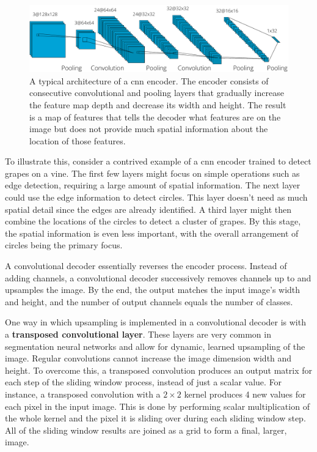 \begin{figure}[h]
 \centering
 \includegraphics[width=\linewidth]{images/cnn_encoder_example.pdf}
 \caption{A typical architecture of a \ac{cnn} encoder. The encoder consists of consecutive convolutional and pooling layers that gradually increase the feature map depth and decrease its width and height. The result is a map of features that tells the decoder what features are on the image but does not provide much spatial information about the location of those features. \cite{lecunGradientbasedLearningApplied1998}}
 \label{fig:cnn-encoder-achitecture}
 \end{figure}

To illustrate this, consider a contrived example of a \ac{cnn} encoder trained to detect grapes on a vine. The first few layers might focus on simple operations such as edge detection, requiring a large amount of spatial information. The next layer could use the edge information to detect circles. This layer doesn't need as much spatial detail since the edges are already identified. A third layer might then combine the locations of the circles to detect a cluster of grapes. By this stage, the spatial information is even less important, with the overall arrangement of circles being the primary focus.

A convolutional decoder essentially reverses the encoder process. Instead of adding channels, a convolutional decoder successively removes channels up to and upsamples the image. By the end, the output matches the input image's width and height, and the number of output channels equals the number of classes.

One way in which upsampling is implemented in a convolutional decoder is with a \textbf{transposed convolutional layer}. These layers are very common in segmentation neural networks and allow for dynamic, learned upsampling of the image. Regular convolutions cannot increase the image dimension width and height. To overcome this, a transposed convolution produces an output matrix for each step of the sliding window process, instead of just a scalar value. For instance, a transposed convolution with a $2 \times 2$ kernel produces 4 new values for each pixel in the input image. This is done by performing scalar multiplication of the whole kernel and the pixel it is sliding over during each sliding window step. All of the sliding window results are joined as a grid to form a final, larger, image.


